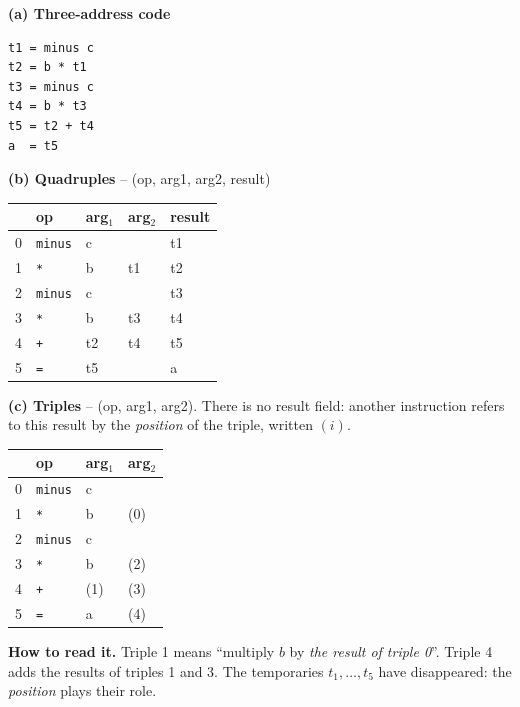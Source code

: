 \documentclass[11pt,a4paper]{article}
\begin{document}
\begin{center}
\begin{minipage}[t]{0.30\textwidth}
\textbf{(a) Three-address code}
\begin{lstlisting}
t1 = minus c
t2 = b * t1
t3 = minus c
t4 = b * t3
t5 = t2 + t4
a  = t5
\end{lstlisting}
\end{minipage}\hfill
\begin{minipage}[t]{0.65\textwidth}
\textbf{(b) Quadruples} -- (op, arg1, arg2, result)

\smallskip
\small
\begin{tabular}{@{}c l l l l@{}}
\toprule
 & op & arg$_1$ & arg$_2$ & result \\ \midrule
0 & \texttt{minus} & c  &    & t1 \\
1 & \texttt{*}     & b  & t1 & t2 \\
2 & \texttt{minus} & c  &    & t3 \\
3 & \texttt{*}     & b  & t3 & t4 \\
4 & \texttt{+}     & t2 & t4 & t5 \\
5 & \texttt{=}     & t5 &    & a  \\ \bottomrule
\end{tabular}
\end{minipage}
\end{center}

\begin{center}
\begin{minipage}[t]{0.55\textwidth}
\textbf{(c) Triples} -- (op, arg1, arg2). There is no result field: another instruction refers to this result by the \emph{position} of the triple, written $(i)$.

\smallskip
\small
\begin{tabular}{@{}c l l l@{}}
\toprule
 & op & arg$_1$ & arg$_2$ \\ \midrule
0 & \texttt{minus} & c  &   \\
1 & \texttt{*}     & b  & (0) \\
2 & \texttt{minus} & c  &   \\
3 & \texttt{*}     & b  & (2) \\
4 & \texttt{+}     & (1) & (3) \\
5 & \texttt{=}     & a  & (4) \\ \bottomrule
\end{tabular}
\end{minipage}\hfill
\begin{minipage}[t]{0.40\textwidth}
\textbf{How to read it.} Triple 1 means ``multiply $b$ by \emph{the result of triple 0}''. Triple 4 adds the results of triples 1 and 3. The temporaries $t_1,\dots,t_5$ have disappeared: the \emph{position} plays their role.
\end{minipage}
\end{center}
\end{document}
